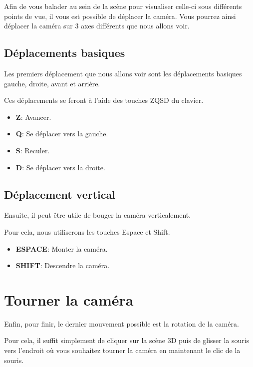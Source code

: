 \documentclass[11pt]{report}
\begin{document}
Afin de vous balader au sein de la scène pour visualiser celle-ci sous différents points de vue, il vous est possible de déplacer la caméra. Vous pourrez ainsi déplacer la caméra sur 3 axes différents que nous allons voir.


\subsection{Déplacements basiques}

\hypertarget{move}{Les premiers déplacement que nous allons voir sont les déplacements basiques gauche, droite, avant et arrière.} Ces déplacements se feront à l'aide des touches ZQSD du clavier.

\begin{itemize}
  \item \textbf{Z}: Avancer.
  \item \textbf{Q}: Se déplacer vers la gauche.
  \item \textbf{S}: Reculer.
  \item \textbf{D}: Se déplacer vers la droite.
\end{itemize}

\subsection{Déplacement vertical}

\hypertarget{moveV}{Ensuite, il peut être utile de bouger la caméra verticalement.} Pour cela, nous utiliserons les touches Espace et Shift.

\begin{itemize}
  \item \textbf{ESPACE}: Monter la caméra.
  \item \textbf{SHIFT}: Descendre la caméra.
\end{itemize}

\section{Tourner la caméra}

\hypertarget{rotate}{Enfin, pour finir, le dernier mouvement possible est la rotation de la caméra.} Pour cela, il suffit simplement de cliquer sur la scène 3D puis de glisser la souris vers l'endroit où vous souhaitez tourner la caméra en maintenant le clic de la souris.

\end{document}
